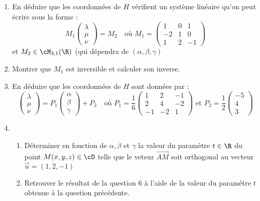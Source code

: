 \documentclass[a4paper, 11pt,reqno]{article}
\begin{document}
\begin{exercice}
\begin{enumerate}
\item En déduire que les coordonnées de $H$ vérifient un système linéaire qu'on peut écrire sous la forme : 
$$M_1 \begin{pmatrix}
\lambda \\
\mu \\
\nu 
\end{pmatrix} = M_2\quad \text{où }  M_1 =\begin{pmatrix}
1 & 0 & 1\\
-2 & 1 & 0\\
1 & 2 &-1 
\end{pmatrix}  $$
et  $M_2\in \cM_{3,1} (\R)$   (qui dépendra de $(\alpha, \beta , \gamma)$ 
\item Montrer que $M_1$ est inversible et calculer son inverse. 
\item En déduire que les coordonnées de $H$ sont données par :
$$\begin{pmatrix}
\lambda \\
\mu \\
\nu 
\end{pmatrix} = P_1 \begin{pmatrix}
\alpha \\
\beta \\
\gamma 
\end{pmatrix} +P_2\quad \text{où }  P_1 =\frac{1}{6}\begin{pmatrix}
1 & 2 & -1\\
2 & 4 & -2\\
-1 & -2 &1 
\end{pmatrix} \text{ et } P_2 =\frac{1}{2}\begin{pmatrix}
-5 \\
4\\
3
\end{pmatrix} $$
\item \begin{enumerate}
\item Déterminer en fonction de $\alpha, \beta$ et $\gamma$ la valeur du paramètre $t\in \R$ du point $M(x,y,z)\in \cD$ telle que le veteur $\vec{AM}$ soit orthogonal au vecteur $\vec{u} = (1,2,-1)$
\item Retrouver le résultat de la question 6 à l'aide de la valeur du paramétre $t$ obtenue à la question précédente. 

\end{enumerate}
\end{enumerate}
\end{exercice}
\end{document}
